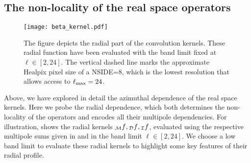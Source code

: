 \subsection{The non-locality of the real space operators} \label{sec:radial_locality}
%
\begin{figure}[t]
\centering
\texttt{[image: beta\_kernel.pdf]}
\caption{The figure depicts the radial part of the convolution kernels. These radial function have been evaluated with the band limit fixed at $\ell \in [2,24]$. The vertical dashed line marks the approximate Healpix pixel size of a NSIDE=8, which is the lowest resolution that allows access to $\ell_{\rm max}=24$.}
\label{fig:beta_kernel}
\end{figure}
%
Above, we have explored in detail the  azimuthal dependence of the real space kernels.  Here we probe the radial dependence, which both  determines the non-locality of the operators and encodes all their multipole dependencies. For illustration,  shows the radial kernels ${_{\mathcal{M}}f}, {_{\mathcal{D}}f},{_{\mathcal{I}}f}$, evaluated using the respective multipole sums given in  and  in the band limit $\ell \in [2,24]$. We choose a low band limit to evaluate these radial kernels to highlight some key features of their radial profile.
%
